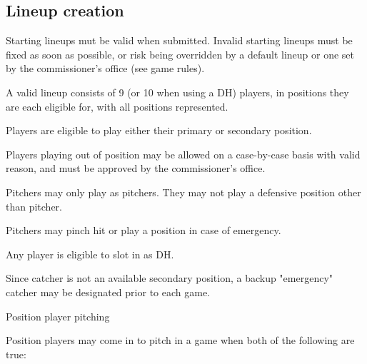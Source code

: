\subsection{Lineup creation}
\begin{deepEnumerate}
    \item Starting lineups mut be valid when submitted.
          Invalid starting lineups must be fixed as soon as possible,
          or risk being overridden by a default lineup
          or one set by the commissioner’s office (see game rules). %
          \begin{deepEnumerate}
                \item A valid lineup consists of 9 (or 10 when using a DH) players,
                      in positions they are each eligible for, with all positions represented.
                      \begin{deepEnumerate}
                            \item Players are eligible to play either their primary or secondary position.
                            \item Players playing out of position may be allowed 
                                  on a case-by-case basis with valid reason,
                                  and must be approved by the commissioner’s office.
                      \end{deepEnumerate}
                  \item Pitchers may only play as pitchers.
                        They may not play a defensive position other than pitcher.
                        \begin{deepEnumerate}
                              \item Pitchers may pinch hit or play a position in case of emergency.
                        \end{deepEnumerate}
                  \item Any player is eligible to slot in as DH.
                  \item Since catcher is not an available secondary position,
                        a backup "emergency" catcher may be designated prior to each game.
                  \item Position player pitching
                        \begin{deepEnumerate}
                              \item Position players may come in to pitch in a game
                                    when both of the following are true:

\end{deepEnumerate}
\end{deepEnumerate}
\end{deepEnumerate}
